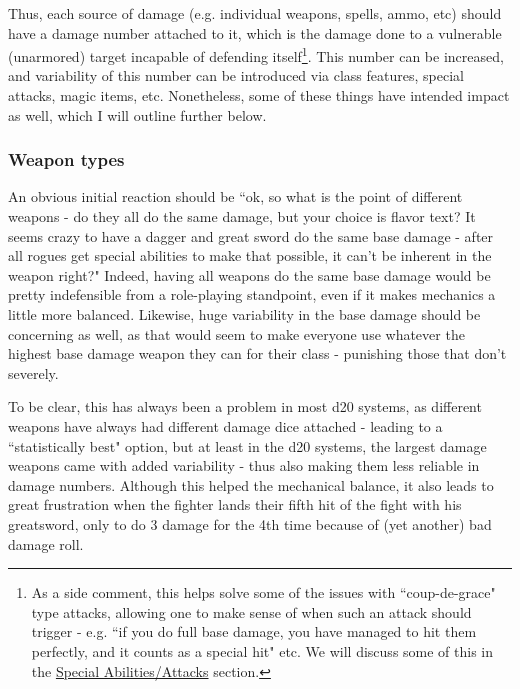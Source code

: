 \documentclass{article}
\begin{document}
        Thus, each source of damage (e.g. individual weapons, spells, ammo, etc) should have a damage number attached to it, which is the damage done to a vulnerable (unarmored) target incapable of defending itself\footnote{As a side comment, this helps solve some of the issues with ``coup-de-grace" type attacks, allowing one to make sense of when such an attack should trigger - e.g. ``if you do full base damage, you have managed to hit them perfectly, and it counts as a special hit" etc. We will discuss some of this in the \hyperref[sec:SpecialAttacks]{Special Abilities/Attacks} section.}. This number can be increased, and variability of this number can be introduced via class features, special attacks, magic items, etc. Nonetheless, some of these things have intended impact as well, which I will outline further below.
        
        \subsubsection{Weapon types}
            An obvious initial reaction should be ``ok, so what is the point of different weapons - do they all do the same damage, but your choice is flavor text? It seems crazy to have a dagger and great sword do the same base damage - after all rogues get special abilities to make that possible, it can't be inherent in the weapon right?" Indeed, having all weapons do the same base damage would be pretty indefensible from a role-playing standpoint, even if it makes mechanics a little more balanced. Likewise, huge variability in the base damage should be concerning as well, as that would seem to make everyone use whatever the highest base damage weapon they can for their class - punishing those that don't severely.
            
            To be clear, this has always been a problem in most d20 systems, as different weapons have always had different damage dice attached - leading to a ``statistically best" option, but at least in the d20 systems, the largest damage weapons came with added variability - thus also making them less reliable in damage numbers. Although this helped the mechanical balance, it also leads to great frustration when the fighter lands their fifth hit of the fight with his greatsword, only to do 3 damage for the 4th time because of (yet another) bad damage roll. 
            
\end{document}
